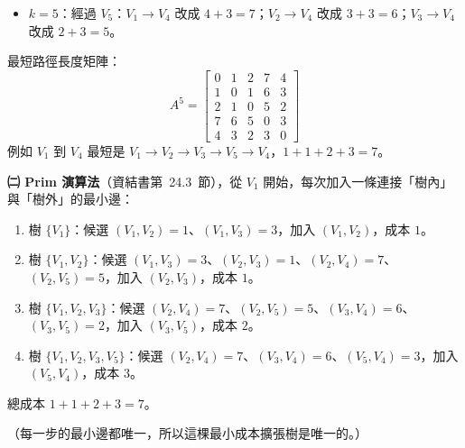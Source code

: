 \begin{pastsoln}
\begin{itemize}
\item $k = 5$：經過 $V_5$：$V_1 \to V_4$ 改成 $4 + 3 = 7$；$V_2 \to V_4$ 改成 $3 + 3 = 6$；$V_3 \to V_4$ 改成 $2 + 3 = 5$。
\end{itemize}
最短路徑長度矩陣：
\[
A^{5} = \begin{bmatrix}
0 & 1 & 2 & 7 & 4 \\
1 & 0 & 1 & 6 & 3 \\
2 & 1 & 0 & 5 & 2 \\
7 & 6 & 5 & 0 & 3 \\
4 & 3 & 2 & 3 & 0
\end{bmatrix}
\]
例如 $V_1$ 到 $V_4$ 最短是 $V_1 \to V_2 \to V_3 \to V_5 \to V_4$，$1 + 1 + 2 + 3 = 7$。

\textbf{㈡ Prim 演算法}（資結書第~24.3~節），從 $V_1$ 開始，每次加入一條連接「樹內」與「樹外」的最小邊：
\begin{enumerate}
\item 樹 $\{V_1\}$：候選 $(V_1,V_2)=1$、$(V_1,V_3)=3$，加入 $(V_1, V_2)$，成本 $1$。
\item 樹 $\{V_1, V_2\}$：候選 $(V_1,V_3)=3$、$(V_2,V_3)=1$、$(V_2,V_4)=7$、$(V_2,V_5)=5$，加入 $(V_2, V_3)$，成本 $1$。
\item 樹 $\{V_1, V_2, V_3\}$：候選 $(V_2,V_4)=7$、$(V_2,V_5)=5$、$(V_3,V_4)=6$、$(V_3,V_5)=2$，加入 $(V_3, V_5)$，成本 $2$。
\item 樹 $\{V_1, V_2, V_3, V_5\}$：候選 $(V_2,V_4)=7$、$(V_3,V_4)=6$、$(V_5,V_4)=3$，加入 $(V_5, V_4)$，成本 $3$。
\end{enumerate}
總成本 $1 + 1 + 2 + 3 = 7$。
\begin{center}
\end{center}
（每一步的最小邊都唯一，所以這棵最小成本擴張樹是唯一的。）


\end{pastsoln}
